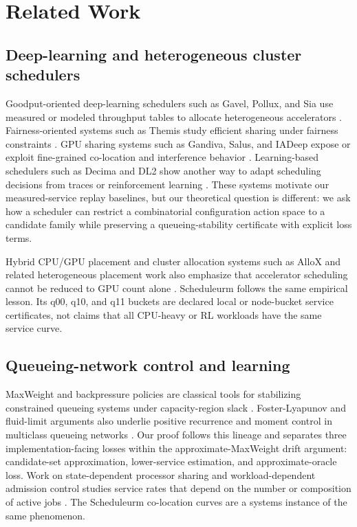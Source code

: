\documentclass[opre,dblanonrev]{informs4}
\begin{document}
\section{Related Work}
\label{sec:related}

\subsection{Deep-learning and heterogeneous cluster schedulers}
\label{subsec:related-systems}

Goodput-oriented deep-learning schedulers such as Gavel, Pollux, and Sia use
measured or modeled throughput tables to allocate heterogeneous accelerators
\citep{narayanan2020gavel,qiao2021pollux,sia2023}.  Fairness-oriented systems
such as Themis study efficient sharing under fairness constraints
\citep{mahajan2020themis}.  GPU sharing systems such as Gandiva, Salus, and
IADeep expose or exploit fine-grained co-location and interference behavior
\citep{xiao2018gandiva,yu2020salus,iadeep2023}.  Learning-based schedulers such
as Decima and DL2 show another way to adapt scheduling decisions from traces or
reinforcement learning \citep{mao2019decima,peng2019dl2}.  These systems
motivate our measured-service replay baselines, but our theoretical question is
different: we ask how a scheduler can restrict a combinatorial configuration
action space to a candidate family while preserving a queueing-stability
certificate with explicit loss terms.

Hybrid CPU/GPU placement and cluster allocation systems such as AlloX and
related heterogeneous placement work also emphasize that accelerator scheduling
cannot be reduced to GPU count alone \citep{le2020allox,carvalho2024workload}.
Scheduleurm follows the same empirical lesson.  Its q00, q10, and q11 buckets
are declared local or node-bucket service certificates, not claims that all
CPU-heavy or RL workloads have the same service curve.

\subsection{Queueing-network control and learning}
\label{subsec:related-queueing}

MaxWeight and backpressure policies are classical tools for stabilizing
constrained queueing systems under capacity-region slack
\citep{tassiulas1992stability,stolyar2004maxweight,neely2010stochastic}.
Foster-Lyapunov and fluid-limit arguments also underlie positive recurrence and
moment control in multiclass queueing networks
\citep{dai1995stability,meyn2009markov}.  Our proof follows this lineage and separates three implementation-facing
losses within the approximate-MaxWeight drift argument: candidate-set approximation,
lower-service estimation, and approximate-oracle loss.  Work on
state-dependent processor sharing and workload-dependent admission control
studies service rates that depend on the number or composition of active jobs
\citep{gupta2022state,bekker2006admission,altman2006dps}.  The Scheduleurm
co-location curves are a systems instance of the same phenomenon.
\end{document}
